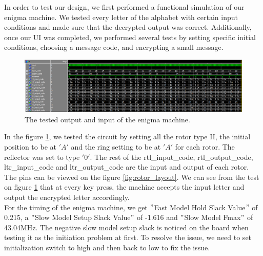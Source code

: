 \documentclass[10pt]{article}
\begin{document}
In order to test our design, we first performed a functional simulation of our enigma machine. We tested every letter of the alphabet with certain input conditions and made sure that the decrypted output was correct. Additionally, once our UI was completed, we performed several tests by setting specific initial conditions, choosing a message code, and encrypting a small message.\\
\begin{figure}[!htb]
    \centering
    \includegraphics[width=1\textwidth]{./enigma_machine_test.png}
    \caption{The tested output and input of the enigma machine.}
    \label{fig:enigma_machine_test}
\end{figure}
\newline
In the figure \ref{fig:enigma_machine_test}, we tested the circuit by setting all the rotor type II, the initial position to be at $'A'$ and the ring setting to be at $'A'$ for each rotor. The reflector was set to type $'0'$. The rest of the rtl\_input\_code, rtl\_output\_code, ltr\_input\_code and ltr\_output\_code are the input and output of each rotor. The pins can be viewed on the figure \ref{fig:rotor_layout}. We can see from the test on figure \ref{fig:enigma_machine_test} that at every key press, the machine accepts the input letter and output the encrypted letter accordingly.\\

For the timing of the enigma machine, we get $"$Fast Model Hold Slack Value$"$ of 0.215, a $"$Slow Model Setup Slack Value$"$ of -1.616 and $"$Slow Model Fmax$"$ of 43.04MHz. The negative slow model setup slack is noticed on the board when testing it as the initiation problem at first. To resolve the issue, we need to set initialization switch to high and then back to low to fix the issue.
\end{document}
